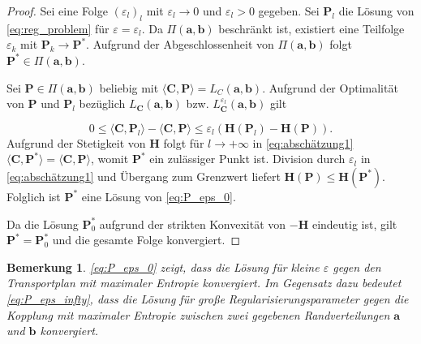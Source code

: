 \documentclass[twoside, 12pt,a4paper]{book}
\newtheorem{remark}[theorem]{Bemerkung}
\numberwithin{equation}{section}
\begin{document}
	\begin{proof}
		Sei eine Folge $(\varepsilon_l)_l$ mit $\varepsilon_l \to 0$ und $\varepsilon_l > 0$ gegeben. Sei $\boldsymbol{P}_l$ die Lösung von  \eqref{eq:reg_problem} für $\varepsilon = \varepsilon_l$. Da $\Pi(\boldsymbol{a},\boldsymbol{b})$ beschränkt ist, existiert eine Teilfolge $\varepsilon_k$ mit $\boldsymbol{P}_k \to \boldsymbol{P}^*$. Aufgrund der Abgeschlossenheit von $\Pi(\boldsymbol{a},\boldsymbol{b})$ folgt $\boldsymbol{P}^* \in \Pi(\boldsymbol{a},\boldsymbol{b})$.
		
		\noindent Sei $\boldsymbol{P} \in \Pi (\boldsymbol{a},\boldsymbol{b})$ beliebig mit $\langle \boldsymbol{C}, \boldsymbol{P} \rangle = L_C(\boldsymbol{a},\boldsymbol{b})$. Aufgrund der Optimalität von $\boldsymbol{P}$ und $\boldsymbol{P}_l$ bezüglich $L_{\boldsymbol{C}}(\boldsymbol{a},\boldsymbol{b})$ bzw. $L_{\boldsymbol{C}}^{\varepsilon_l}(\boldsymbol{a},\boldsymbol{b})$ gilt
		
		\begin{equation}
		0 \leq \langle \boldsymbol{C}, \boldsymbol{P}_l\rangle - \langle \boldsymbol{C}, \boldsymbol{P}\rangle \leq \varepsilon_l (\boldsymbol{H}(\boldsymbol{P}_l)-\boldsymbol{H}(\boldsymbol{P})). \label{eq:abschätzung1}
		\end{equation}
		Aufgrund der Stetigkeit von $\boldsymbol{H}$ folgt für $l \to +\infty$ in \eqref{eq:abschätzung1} $\langle \boldsymbol{C}, \boldsymbol{P}^* \rangle = \langle \boldsymbol{C}, \boldsymbol{P} \rangle$, womit $\boldsymbol{P}^*$ ein zulässiger Punkt ist. Division durch $\varepsilon_l$ in \eqref{eq:abschätzung1} und Übergang zum Grenzwert liefert $\boldsymbol{H}(\boldsymbol{P})\leq \boldsymbol{H}(\boldsymbol{P}^*)$. Folglich ist $\boldsymbol{P}^*$ eine Lösung von \eqref{eq:P_eps_0}.
		
		\noindent Da die Lösung $\boldsymbol{P}_0^*$ aufgrund der strikten Konvexität von $-\boldsymbol{H}$ eindeutig ist, gilt $\boldsymbol{P}^* = \boldsymbol{P}_0^*$ und die gesamte Folge konvergiert.
		
		
	\end{proof}
	
	\begin{remark}
		\eqref{eq:P_eps_0} zeigt, dass die Lösung für kleine $\varepsilon$ gegen den Transportplan mit maximaler Entropie konvergiert. Im Gegensatz dazu bedeutet \eqref{eq:P_eps_infty}, dass die Lösung für große Regularisierungsparameter gegen die Kopplung mit maximaler Entropie zwischen zwei gegebenen Randverteilungen $\boldsymbol{a}$ und $\boldsymbol{b}$ konvergiert.		
	\end{remark}
	
\end{document}
